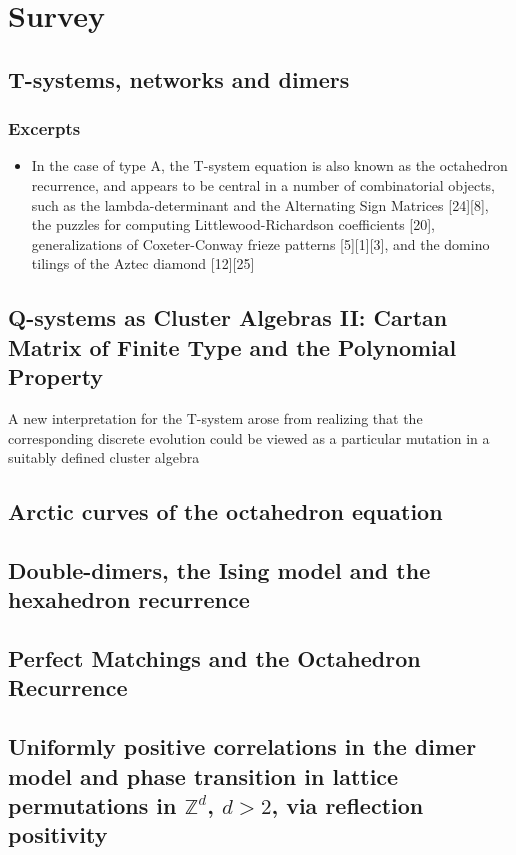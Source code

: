 \chapter{Survey}


\section{T-systems, networks and dimers \cite{di2014tystemsnetworksdimers}	}
\subsection{Excerpts}
\begin{itemize}
	\item  In the case of type A, the T-system equation is also known as the octahedron recurrence, and appears to be central in a number of combinatorial objects, such as the lambda-determinant and the Alternating Sign Matrices [24][8], the puzzles for computing Littlewood-Richardson coefficients [20], generalizations of Coxeter-Conway frieze patterns [5][1][3], and the domino tilings of the Aztec diamond [12][25]
\end{itemize}

\section{Q-systems as Cluster Algebras {II}: Cartan Matrix of Finite Type and the Polynomial Property \cite{Di_Francesco_2009}}
A new interpretation for the T-system arose from realizing that the corresponding discrete evolution could be viewed as a particular mutation in a suitably defined cluster algebra

\section{Arctic curves of the octahedron equation \cite{di2014arctic}}


\section{Double-dimers, the Ising model and the hexahedron recurrence \cite{kenyon2013double}}

\section{Perfect Matchings and the Octahedron Recurrence \cite{speyer2004perfect}}

\section{Uniformly positive correlations in the dimer model and
	phase transition in lattice permutations in $\mathbb{Z}^d$, $d > 2$, via reflection positivity \cite{taggi2019uniformly}}
